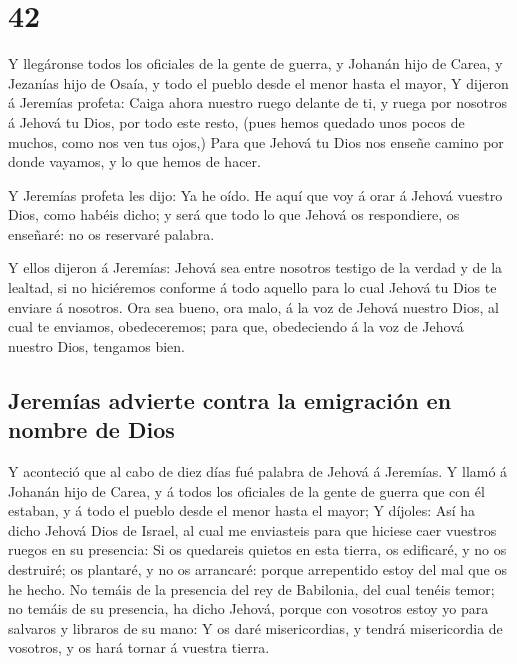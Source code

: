 \hypertarget{section-24-42}{%
\section{42}\label{section-24-42}}

 Y llegáronse todos los oficiales de la gente de guerra, y
Johanán hijo de Carea, y Jezanías hijo de Osaía, y todo el pueblo desde
el menor hasta el mayor,  Y dijeron á Jeremías profeta:
Caiga ahora nuestro ruego delante de ti, y ruega por nosotros á Jehová
tu Dios, por todo este resto, (pues hemos quedado unos pocos de muchos,
como nos ven tus ojos,)  Para que Jehová tu Dios nos
enseñe camino por donde vayamos, y lo que hemos de hacer.

 Y Jeremías profeta les dijo: Ya he oído. He aquí que voy
á orar á Jehová vuestro Dios, como habéis dicho; y será que todo lo que
Jehová os respondiere, os enseñaré: no os reservaré palabra.

 Y ellos dijeron á Jeremías: Jehová sea entre nosotros
testigo de la verdad y de la lealtad, si no hiciéremos conforme á todo
aquello para lo cual Jehová tu Dios te enviare á nosotros.
 Ora sea bueno, ora malo, á la voz de Jehová nuestro Dios,
al cual te enviamos, obedeceremos; para que, obedeciendo á la voz de
Jehová nuestro Dios, tengamos bien.

\hypertarget{jeremuxedas-advierte-contra-la-emigraciuxf3n-en-nombre-de-dios}{%
\subsection{Jeremías advierte contra la emigración en nombre de
Dios}\label{jeremuxedas-advierte-contra-la-emigraciuxf3n-en-nombre-de-dios}}

 Y aconteció que al cabo de diez días fué palabra de
Jehová á Jeremías.  Y llamó á Johanán hijo de Carea, y á
todos los oficiales de la gente de guerra que con él estaban, y á todo
el pueblo desde el menor hasta el mayor;  Y díjoles: Así
ha dicho Jehová Dios de Israel, al cual me enviasteis para que hiciese
caer vuestros ruegos en su presencia:  Si os quedareis
quietos en esta tierra, os edificaré, y no os destruiré; os plantaré, y
no os arrancaré: porque arrepentido estoy del mal que os he hecho.
 No temáis de la presencia del rey de Babilonia, del cual
tenéis temor; no temáis de su presencia, ha dicho Jehová, porque con
vosotros estoy yo para salvaros y libraros de su mano:  Y
os daré misericordias, y tendrá misericordia de vosotros, y os hará
tornar á vuestra tierra.

